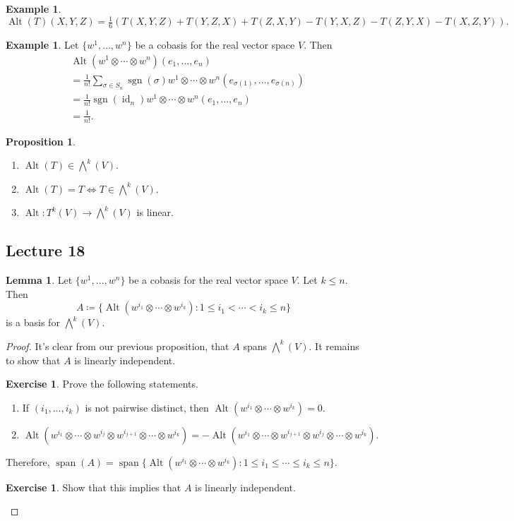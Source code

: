 \documentclass[10pt,letterpaper,cm]{nupset}
\theoremstyle{definition}
\newtheorem{exmp}[definition]{Example}
\theoremstyle{theorem}
\newtheorem{lemma}[definition]{Lemma}
\newtheorem{prop}[definition]{Proposition}
\newtheorem{exercise}[definition]{Exercise}
\theoremstyle{remark}
\newcommand{\1}{\mathbf{1}}
\newcommand{\0}{\vec 0}
\DeclareMathOperator*{\Span}{span}
\DeclareMathOperator{\id}{id}
\DeclareMathOperator{\Alt}{Alt}
\DeclareMathOperator{\sgn}{sgn}
\begin{document}
\begin{exmp}
$\Alt(T)(X, Y, Z)= \frac{1}{6}(T(X, Y, Z) + T(Y, Z, X) + T(Z, X, Y) -T(Y, X, Z)- T(Z, Y, X) -T(X, Z, Y)).$
\end{exmp}

\begin{exmp}
Let $\{w^1, \ldots, w^n\}$ be a cobasis for the real vector space $V$. Then
\begin{align*}
& \Alt(w^1 \otimes \cdots \otimes w^n)(e_1, \ldots, e_n)\\ & = \frac{1}{n!} \sum_{\sigma \in S_n} \sgn(\sigma)w^1 \otimes \cdots \otimes w^n(e_{\sigma(1)}, \ldots, e_{\sigma(n)}) \\ & =  \frac{1}{n!} \sgn(\id_n) w^1 \otimes \cdots \otimes w^n(e_{1}, \ldots, e_{n}) \\ & = \frac{1}{n!}.
\end{align*}
\end{exmp}

\begin{prop}\label{alt} $ $
\begin{enumerate}
\item $\Alt(T) \in \bigwedge^k(V)$.
\item $\Alt(T) = T \iff T \in \bigwedge^k(V)$.
\item $\Alt : T^k(V) \to \bigwedge^k(V)$ is linear. 
\end{enumerate}
\end{prop}

\subsection{Lecture 18}

\begin{lemma}
Let $\{w^1, \ldots, w^n\}$ be a cobasis for the real vector space $V$. Let $k\leq n$. Then $$A\coloneqq   \{\Alt(w^{i_1} \otimes \cdots \otimes w^{i_k}) : 1 \leq i_1 < \cdots < i_k \leq n \} $$ is a basis for $\bigwedge^k(V)$.
\end{lemma}
\begin{proof}
It's clear from our previous proposition, that $A$ spans $\bigwedge^k(V)$. It remains to show that $A$ is linearly independent. 
\begin{exercise} Prove the following statements. 
\begin{enumerate}
\item If $(i_1, \ldots, i_k)$ is not pairwise distinct, then $\Alt(w^{i_1} \otimes \cdots \otimes w^{i_k}) = 0$.
\item $\Alt(w^{i_1} \otimes \cdots \otimes w^{i_j} \otimes w^{i_{j+1}} \otimes \cdots \otimes w^{i_k}) = -\Alt(w^{i_1} \otimes \cdots \otimes w^{i_{j+1}} \otimes w^{i_{j}} \otimes \cdots \otimes w^{i_k}).$
\end{enumerate}
\end{exercise}
Therefore, $\Span(A) = \Span\{\Alt(w^{i_1} \otimes \cdots \otimes w^{i_k}) : 1 \leq i_1 \leq \cdots \leq i_k \leq n \} $.
\begin{exercise}
Show that this implies that $A$ is linearly independent.
\end{exercise}
\end{proof}
\end{document}
